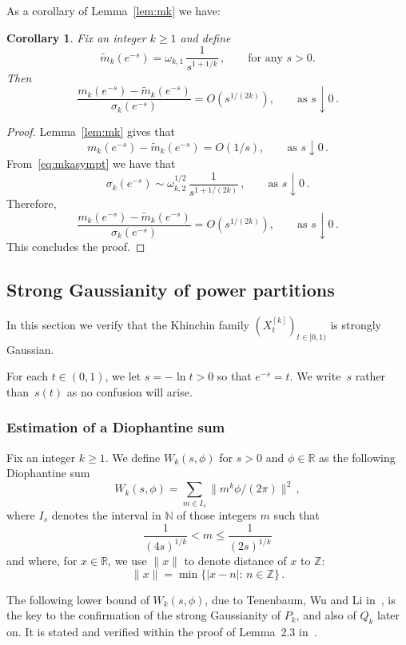 \documentclass[12pt]{amsart}
\newtheorem{corollary}{Corollary}[section]
\theoremstyle{definition}
\newcommand{\R}{\mathbb{R}}
\newcommand{\N}{\mathbb{N}}
\newcommand{\Z}{\mathbb{Z}}
\begin{document}
As a corollary of Lemma~\ref{lem:mk} we have:

\begin{corollary}\label{cor:mkasympt}
Fix an integer $k\ge 1$ and define
\[
\tilde{m}_k(e^{-s}) = \omega_{k,1}\,\frac{1}{s^{1+1/k}}\,, \qquad \text{for any } s>0.
\]
Then
\[
\frac{m_k(e^{-s})-\tilde{m}_k(e^{-s})}{\sigma_k(e^{-s})} = O(s^{1/(2k)}), \qquad \text{as } s\downarrow 0\,.
\]
\end{corollary}

\begin{proof}
Lemma~\ref{lem:mk} gives that
\[
m_k(e^{-s}) - \tilde{m}_k(e^{-s}) = O(1/s), \qquad \text{as } s\downarrow 0\,.
\]
From~\eqref{eq:mkasympt} we have that
\[
\sigma_k(e^{-s}) \sim \omega_{k,2}^{1/2}\,\frac{1}{s^{1+1/(2k)}}\,, \qquad \text{as } s\downarrow 0\,.
\]
Therefore,
\[
\frac{m_k(e^{-s})-\tilde{m}_k(e^{-s})}{\sigma_k(e^{-s})} = O(s^{1/(2k)}), \qquad \text{as } s\downarrow 0\,.
\]
This concludes the proof.
\end{proof}


\subsection{Strong Gaussianity of power partitions}\label{subsec:strongGaussianityproof}

In this section we verify
that the Khinchin family $(X^{[k]}_t)_{t\in[0,1)}$ is strongly Gaussian.
\smallskip

For each $t\in(0,1)$, we let $s=-\ln t > 0$ so that $e^{-s}=t$. We write~$s$ rather than~$s(t)$
as no confusion will arise.

\subsubsection{Estimation of a Diophantine sum}

Fix an integer $k \ge 1$. We define $W_k(s,\phi)$  for $s >0$ and $\phi \in \R$ as the following Diophantine sum
$$W_k(s,\phi)=\sum_{m \in I_s} \| m^k \phi/(2\pi)\|^2\,,
$$
where $I_s$ denotes the interval in $\N$ of those integers $m$ such that
$$\frac{1}{(4s)^{1/k}} <m \le \frac{1}{(2s)^{1/k}}$$
and where, for $x \in \R$, we use $\|x\|$ to denote distance of $x$ to $\mathbb{Z}$:
$$\|x\|=\min\{|x-n|:\,n \in \Z\}\,.$$

The following lower bound of  $W_k(s,\phi)$, due to Tenenbaum, Wu and Li in~\cite{TWLarxiv}, is the key to the confirmation of the strong Gaussianity of $P_k$, and also of $Q_k$ later on. It is stated and verified  within the proof of Lemma~2.3 in~\cite{TWLarxiv}.
\end{document}
